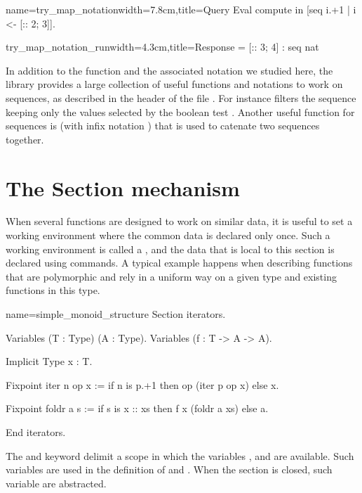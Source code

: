 \begin{coq}{name=try_map_notation}{width=7.8cm,title=Query}
Eval compute in [seq i.+1 | i <- [:: 2; 3]].
\end{coq}
\begin{coqout}{try_map_notation_run}{width=4.3cm,title=Response}
= [:: 3; 4] : seq nat
\end{coqout}
In addition to the function  and the associated notation
we studied here, the \mcbMC{} library
provides a large collection of useful functions and notations to work on
sequences, as described in the header of the file .  For
instance \C{[seq i <- s | p]} filters the sequence  keeping only
the values selected by the boolean test .
Another useful function for sequences is  (with infix notation \C{++})
that is used to catenate two sequences together.

\section{The Section mechanism}
When several functions are designed to work on similar data, it is
useful to set a working environment where the common data is declared
only once.  Such a working environment is called a , and
the data that is local to this section is declared using 
commands.  A typical example happens when describing functions that
are polymorphic and rely in a uniform way on a given type and existing
functions in this type.

\begin{coq}{name=simple_monoid_structure}{}
Section iterators.

Variables (T : Type) (A : Type).
Variables (f : T -> A -> A).

Implicit Type x : T.

Fixpoint iter n op x :=
  if n is p.+1 then op (iter p op x) else x.

Fixpoint foldr a s :=
  if s is x :: xs then f x (foldr a xs) else a.

End iterators.
\end{coq}
The  and  keyword delimit a scope in which
the variables ,  and  are available.  Such variables
are used in the definition of  and .  When the section is
closed, such variable are abstracted.

